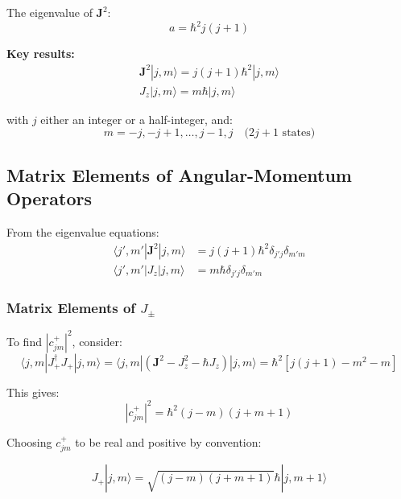 \documentclass[11pt,a4paper]{article}
\begin{document}
The eigenvalue of $\mathbf{J}^2$:
\begin{equation}
a = \hbar^2 j(j+1)
\tag{3.183}
\end{equation}

\textbf{Key results:}
\begin{align}
\boxed{\mathbf{J}^2|j, m\rangle = j(j+1)\hbar^2|j, m\rangle} \tag{3.186a} \\
\boxed{J_z|j, m\rangle = m\hbar|j, m\rangle} \tag{3.186b}
\end{align}

with $j$ either an integer or a half-integer, and:
\begin{equation}
\boxed{m = -j, -j+1, \ldots, j-1, j \quad \text{($2j+1$ states)}}
\tag{3.185}
\end{equation}

\subsection{Matrix Elements of Angular-Momentum Operators}

From the eigenvalue equations:
\begin{align}
\langle j', m'|\mathbf{J}^2|j, m\rangle &= j(j+1)\hbar^2\delta_{j'j}\delta_{m'm} \tag{3.187a} \\
\langle j', m'|J_z|j, m\rangle &= m\hbar\delta_{j'j}\delta_{m'm} \tag{3.187b}
\end{align}

\subsubsection{Matrix Elements of $J_\pm$}

To find $|c_{jm}^+|^2$, consider:
\begin{equation}
\langle j, m|J_+^\dagger J_+|j, m\rangle = \langle j, m|(\mathbf{J}^2 - J_z^2 - \hbar J_z)|j, m\rangle = \hbar^2[j(j+1) - m^2 - m]
\tag{3.188}
\end{equation}

This gives:
\begin{equation}
|c_{jm}^+|^2 = \hbar^2(j-m)(j+m+1)
\tag{3.190}
\end{equation}

Choosing $c_{jm}^+$ to be real and positive by convention:

\begin{equation}
\boxed{J_+|j, m\rangle = \sqrt{(j-m)(j+m+1)}\hbar|j, m+1\rangle}
\tag{3.191}
\end{equation}
\end{document}
